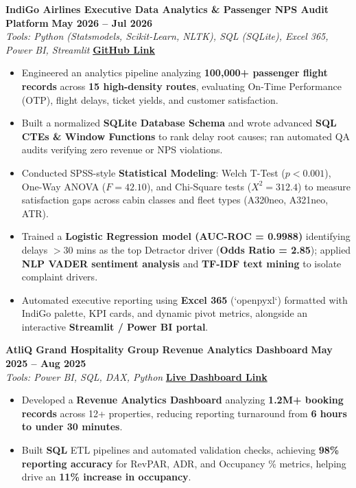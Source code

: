 \documentclass[a4paper,10pt]{article}
\begin{document}
\textbf{IndiGo Airlines Executive Data Analytics \& Passenger NPS Audit Platform} \hfill \textbf{May 2026 -- Jul 2026} \\
\textit{Tools: Python (Statsmodels, Scikit-Learn, NLTK), SQL (SQLite), Excel 365, Power BI, Streamlit} \hfill \href{https://github.com/Ramkadammmm/indigo-data-analytics-project}{\textbf{GitHub Link}}
\begin{itemize}
    \item Engineered an analytics pipeline analyzing \textbf{100,000+ passenger flight records} across \textbf{15 high-density routes}, evaluating On-Time Performance (OTP), flight delays, ticket yields, and customer satisfaction.
    \item Built a normalized \textbf{SQLite Database Schema} and wrote advanced \textbf{SQL CTEs & Window Functions} to rank delay root causes; ran automated QA audits verifying zero revenue or NPS violations.
    \item Conducted SPSS-style \textbf{Statistical Modeling}: Welch T-Test ($p < 0.001$), One-Way ANOVA ($F = 42.10$), and Chi-Square tests ($X^2 = 312.4$) to measure satisfaction gaps across cabin classes and fleet types (A320neo, A321neo, ATR).
    \item Trained a \textbf{Logistic Regression model (AUC-ROC = 0.9988)} identifying delays $>30$ mins as the top Detractor driver (\textbf{Odds Ratio = 2.85}); applied \textbf{NLP VADER sentiment analysis} and \textbf{TF-IDF text mining} to isolate complaint drivers.
    \item Automated executive reporting using \textbf{Excel 365} (`openpyxl`) formatted with IndiGo palette, KPI cards, and dynamic pivot metrics, alongside an interactive \textbf{Streamlit / Power BI portal}.
\end{itemize}

\vspace{5pt}

\textbf{AtliQ Grand Hospitality Group Revenue Analytics Dashboard} \hfill \textbf{May 2025 -- Aug 2025} \\
\textit{Tools: Power BI, SQL, DAX, Python} \hfill \href{https://app.powerbi.com/view?r=eyJrIjoiYTEwZTc0MmYtNzk4OC00NzhhLWFjN2MtMTZiMzU4NWU2OGJkIiwidCI6ImM2ZTU0OWIzLTVmNDUtNDAzMi1hYWU5LWQ0MjQ0ZGM1YjJjNCJ9}{\textbf{Live Dashboard Link}}
\begin{itemize}
    \item Developed a \textbf{Revenue Analytics Dashboard} analyzing \textbf{1.2M+ booking records} across 12+ properties, reducing reporting turnaround from \textbf{6 hours to under 30 minutes}.
    \item Built \textbf{SQL} ETL pipelines and automated validation checks, achieving \textbf{98\% reporting accuracy} for RevPAR, ADR, and Occupancy \% metrics, helping drive an \textbf{11\% increase in occupancy}.
\end{itemize}
\end{document}
